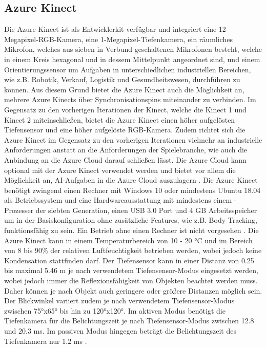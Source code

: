 \subsection{Azure Kinect}
Die Azure Kinect ist als Entwicklerkit verfügbar und integriert eine 12-Megapixel-RGB-Kamera, eine 1-Megapixel-Tiefenkamera, ein räumliches Mikrofon, welches aus sieben in Verbund geschaltenen Mikrofonen besteht, welche in einem Kreis hexagonal und in dessem Mittelpunkt angeordnet sind, und einem Orientierungssensor um Aufgaben in unterschiedlichen industriellen Bereichen, wie z.B. Robotik, Verkauf, Logistik und Gesundheitswesen, durchführen zu können. Aus diesem Grund bietet die Azure Kinect auch die Möglichkeit an, mehrere Azure Kinects über Synchronisationspins miteinander zu verbinden. Im Gegensatz zu den vorherigen Iterationen der Kinect, welche die Kinect 1 und Kinect 2 miteinschließen, bietet die Azure Kinect einen höher aufgelösten Tiefensensor und eine höher aufgelöste RGB-Kamera. Zudem richtet sich die Azure Kinect im Gegensatz zu den vorherigen Iterationen vielmehr an industrielle Anforderungen anstatt an die Anforderungen der Spielebranche, wie auch die Anbindung an die Azure Cloud darauf schließen lässt. Die Azure Cloud kann optional mit der Azure Kinect verwendet werden und bietet vor allem die Möglichkeit an, AI-Aufgaben in die Azure Cloud auszulagern \cite{azure_kinect_2020}. Die Azure Kinect benötigt zwingend einen Rechner mit Windows 10 oder mindestens Ubuntu 18.04 als Betriebssystem und eine Hardwareausstattung mit mindestens einem -Prozesser der siebten Generation, einen USB 3.0 Port und 4 GB Arbeitsspeicher um in der Basiskonfiguration ohne zusätzliche Features, wie z.B. Body Tracking, funktionsfähig zu sein. Ein Betrieb ohne einen Rechner ist nicht vorgesehen \cite{azure_kinect_dk_nodate}. Die Azure Kinect kann in einem Temperaturbereich von 10 - 20 °C und im Bereich von 8 bis 90\% der relativen Luftfeuchtigkeit betrieben werden, wobei jedoch keine Kondensation stattfinden darf. Der Tiefensensor kann in einer Distanz von \num{0,25} bis maximal \num{5,46} m je nach verwendetem Tiefensensor-Modus eingesetzt werden, wobei jedoch immer die Reflexionsfähigkeit von Objekten beachtet werden muss. Daher können je nach Objekt auch geringere oder größere Distanzen möglich sein. Der Blickwinkel variiert zudem je nach verwendetem Tiefensensor-Modus zwischen 75°x65° bis hin zu 120°x120°. Im aktiven Modus benötigt die Tiefenkamera für die Belichtungszeit je nach Tiefensensor-Modus zwischen \num{12,8} und \num{20,3} ms. Im passiven Modus hingegen beträgt die Belichtungszeit des Tiefenkamera nur \num{1,2} ms \cite{tesych_azure_nodate}.

